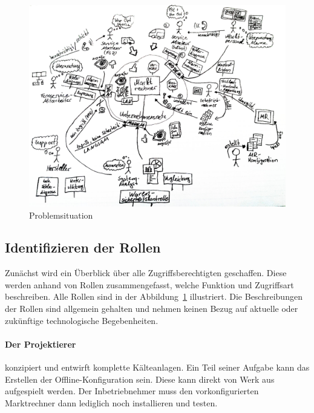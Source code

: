 \documentclass[11pt,a4paper]{report}
\begin{document}
\begin{figure}[htb]
\centering
\includegraphics[scale=0.215]{images/problemsituation.jpg}
\caption{Problemsituation}
\label{fig:problem_situation}
\end{figure}

\subsection{Identifizieren der Rollen} \label{sec:roles}

Zunächst wird ein Überblick über alle Zugriffsberechtigten geschaffen. Diese werden anhand von Rollen zusammengefasst, welche Funktion und Zugriffsart beschreiben. Alle Rollen sind in der Abbildung~\ref{fig:problem_situation} illustriert. Die Beschreibungen der Rollen sind allgemein gehalten und nehmen keinen Bezug auf aktuelle oder zukünftige technologische Begebenheiten.

\paragraph{Der Projektierer} konzipiert und entwirft komplette Kälteanlagen. Ein Teil seiner Aufgabe kann das Erstellen der Offline-Konfiguration sein. Diese kann direkt von Werk aus aufgespielt werden. Der Inbetriebnehmer muss den vorkonfigurierten Marktrechner dann lediglich noch installieren und testen.
\end{document}
